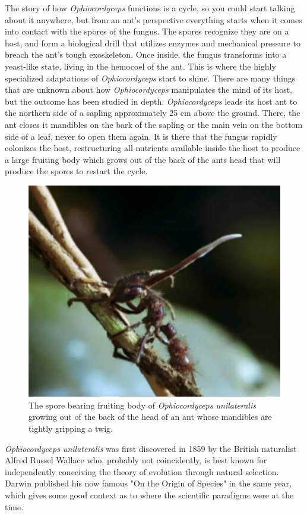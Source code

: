 \documentclass[twocolumn]{article}
\begin{document}
The story of how \textit{Ophiocordyceps} functions is a cycle, so you could start talking about it anywhere, but from an ant's perspective everything starts when it comes into contact with the spores of the fungus. The spores recognize they are on a host, and form a biological drill that utilizes enzymes and mechanical pressure to breach the ant's tough exoskeleton. Once inside, the fungus transforms into a yeast-like state, living in the hemocoel of the ant.\cite{cordy_infection} This is where the highly specialized adaptations of \textit{Ophiocordyceps} start to shine. There are many things that are unknown about how \textit{Ophiocordyceps} manipulates the mind of its host, but the outcome has been studied in depth. \textit{Ophiocordyceps} leads its host ant to the northern side of a sapling approximately 25 cm above the ground. There, the ant closes it mandibles on the bark of the sapling or the main vein on the bottom side of a leaf, never to open them again. It is there that the fungus rapidly colonizes the host, restructuring all nutrients available inside the host to produce a large fruiting body which grows out of the back of the ants head that will produce the spores to restart the cycle.\cite{life_of_dead_ant}

\begin{figure}[!ht]
    \centering
    \includegraphics[width=.4\textwidth]{images/cordyceps_ant.jpg}
    \caption{The spore bearing fruiting body of \textit{Ophiocordyceps unilateralis} growing out of the back of the head of an ant whose mandibles are tightly gripping a twig.\cite{cordy_video} }
    \label{fig:cordyceps_ant}
\end{figure}

\textit{Ophiocordyceps unilateralis} was first discovered in 1859 by the British naturalist Alfred Russel Wallace who, probably not coincidently, is best known for independently conceiving the theory of evolution through natural selection. Darwin published his now famous "On the Origin of Species" in the same year, which gives some good context as to where the scientific paradigms were at the time.\cite{darwin} 
\end{document}
